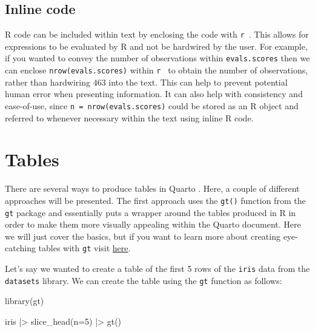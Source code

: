 \documentclass[
  letterpaper,
  DIV=11,
  numbers=noendperiod]{scrartcl}
\newenvironment{Shaded}{\begin{snugshade}}{\end{snugshade}}
\newcommand{\AttributeTok}[1]{\textcolor[rgb]{0.40,0.45,0.13}{#1}}
\newcommand{\DecValTok}[1]{\textcolor[rgb]{0.68,0.00,0.00}{#1}}
\newcommand{\FunctionTok}[1]{\textcolor[rgb]{0.28,0.35,0.67}{#1}}
\newcommand{\NormalTok}[1]{\textcolor[rgb]{0.00,0.23,0.31}{#1}}
\newcommand{\SpecialCharTok}[1]{\textcolor[rgb]{0.37,0.37,0.37}{#1}}
\begin{document}
\hypertarget{inline-code}{%
\subsection{Inline code}\label{inline-code}}

R code can be included within text by enclosing the code with
\texttt{\textasciigrave{}r\ \textasciigrave{}}. This allows for
expressions to be evaluated by R and not be hardwired by the user. For
example, if you wanted to convey the number of observations within
\texttt{evals.scores} then we can enclose \texttt{nrow(evals.scores)}
within \texttt{\textasciigrave{}r\ \textasciigrave{}} to obtain the
number of observations, rather than hardwiring 463 into the text. This
can help to prevent potential human error when presenting information.
It can also help with consistency and ease-of-use, since
\texttt{n\ =\ nrow(evals.scores)} could be stored as an R object and
referred to whenever necessary within the text using inline R code.

\hypertarget{tables}{%
\section{Tables}\label{tables}}

There are several ways to produce tables in Quarto . Here, a couple of
different approaches will be presented. The first approach uses the
\texttt{gt()} function from the \texttt{gt} package and essentially puts
a wrapper around the tables produced in R in order to make them more
visually appealing within the Quarto document. Here we will just cover
the basics, but if you want to learn more about creating eye-catching
tables with \texttt{gt} visit
\href{https://gt.rstudio.com/articles/intro-creating-gt-tables.html}{here}.

Let's say we wanted to create a table of the first 5 rows of the
\texttt{iris} data from the \texttt{datasets} library. We can create the
table using the \texttt{gt} function as follows:

\begin{Shaded}
\begin{Highlighting}[]
\FunctionTok{library}\NormalTok{(gt)}

\NormalTok{iris }\SpecialCharTok{|\textgreater{}} 
  \FunctionTok{slice\_head}\NormalTok{(}\AttributeTok{n=}\DecValTok{5}\NormalTok{) }\SpecialCharTok{|\textgreater{}}
  \FunctionTok{gt}\NormalTok{() }
\end{Highlighting}
\end{Shaded}
\end{document}
